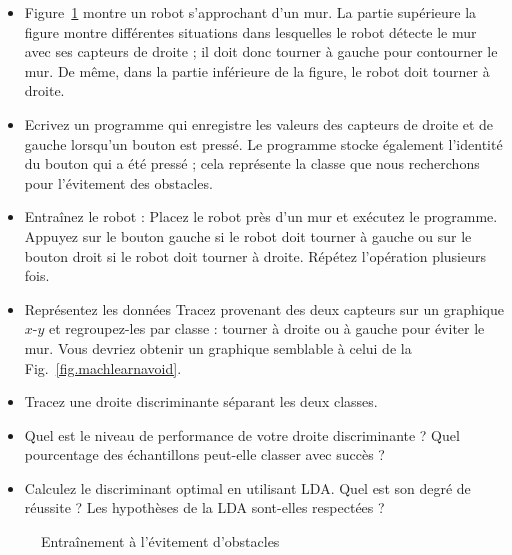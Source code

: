 \begin{framed}
\begin{itemize}
\item Figure~\ref{fig.train-data-avoid} montre un robot s'approchant d'un mur. La partie supérieure la figure montre différentes situations dans lesquelles le robot détecte le mur avec ses capteurs de droite ; il doit donc tourner à gauche pour contourner le mur. De même, dans la partie inférieure de la figure, le robot doit tourner à droite.
\item Ecrivez un programme qui enregistre les valeurs des capteurs de droite et de gauche lorsqu'un bouton est pressé. Le programme stocke également l'identité du bouton qui a été pressé ; cela représente la classe que nous recherchons pour l'évitement des obstacles.
\item Entraînez le robot : Placez le robot près d'un mur et exécutez le programme. Appuyez sur le bouton gauche si le robot doit tourner à gauche ou sur le bouton droit si le robot doit tourner à droite. Répétez l'opération plusieurs fois.
\item Représentez les données Tracez provenant des deux capteurs sur un graphique $x$-$y$ et regroupez-les par classe : tourner à droite ou à gauche pour éviter le mur. Vous devriez obtenir un graphique semblable à celui de la Fig.~\ref{fig.machlearnavoid}.
\item Tracez une droite discriminante séparant les deux classes.
\item Quel est le niveau de performance de votre droite discriminante ? Quel pourcentage des échantillons peut-elle classer avec succès ?
\item Calculez le discriminant optimal en utilisant LDA. Quel est son degré de réussite ? Les hypothèses de la LDA sont-elles respectées ?
\end{itemize}
\end{framed}

\begin{figure}
\begin{center}
\end{center}
\caption{Entraînement à l'évitement d'obstacles}\label{fig.train-data-avoid}
\end{figure}

